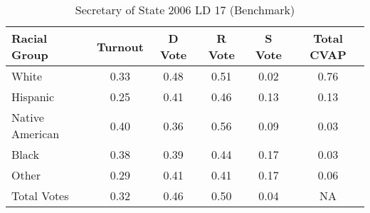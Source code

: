 \begin{table}[htb]
\begin{center}
\caption{Secretary of State 2006 LD 17 (Benchmark)}
\label{sos06_cvap_ld_17_benchmark}
\begin{tabular}{lccccc}
  \hline
Racial Group & Turnout & D Vote & R Vote & S Vote & Total CVAP \\ 
  \hline
    White & 0.33  & 0.48  & 0.51  & 0.02  & 0.76 \\
    Hispanic & 0.25  & 0.41  & 0.46  & 0.13  & 0.13 \\
    Native American & 0.40  & 0.36  & 0.56  & 0.09  & 0.03 \\
    Black & 0.38  & 0.39  & 0.44  & 0.17  & 0.03 \\
    Other & 0.29  & 0.41  & 0.41  & 0.17  & 0.06 \\
    Total Votes & 0.32  & 0.46  & 0.50  & 0.04  &  NA \\
   \hline
\end{tabular}
\end{center}
\end{table}
